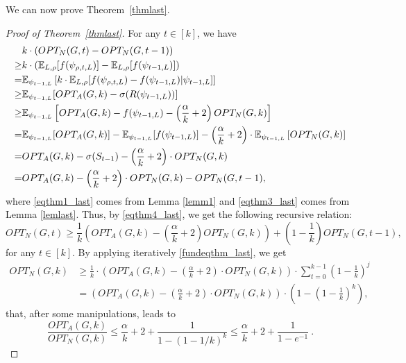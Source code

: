 We can now prove Theorem~\ref{thmlast}.
\begin{proof}[Proof of Theorem~\ref{thmlast}]
For any $t\in [k]$, we have
\begin{align}
&k\cdot (OPT_N(G,t)-OPT_N(G,t-1))\nonumber\\
\geq &k\cdot (\mathbb{E}_{L,\rho}[f({\psi}_{\rho,t,L})]-\mathbb{E}_{L,\rho}[f(\psi_{t-1,L})])\nonumber\\
=& \mathbb{E}_{\psi_{t-1,L}}\left[k\cdot \mathbb{E}_{L,\rho}[f({\psi}_{\rho,t,L})-f(\psi_{t-1,L})|\psi_{t-1,L}]\right]\nonumber\\
\geq &\mathbb{E}_{\psi_{t-1,L}}[OPT_A(G,k)-\sigma(R(\psi_{t-1,L}))]\label{eqthm1_last}\\
\geq &\mathbb{E}_{\psi_{t-1,L}}\left[OPT_A(G,k)-f(\psi_{t-1,L})-\left(\frac{\alpha}{k}+2\right)OPT_N(G,k)\right]\label{eqthm3_last}\\
=& \mathbb{E}_{\psi_{t-1,L}}[OPT_A(G,k)]-\mathbb{E}_{\psi_{t-1,L}}[f(\psi_{t-1,L})]-\left(\frac{\alpha}{k}+2\right)\cdot\mathbb{E}_{\psi_{t-1,L}}\left[OPT_N(G,k)\right]\nonumber\\
= &OPT_A(G,k)-\sigma(S_{t-1})-\left(\frac{\alpha}{k}+2\right)\cdot OPT_N(G,k)\nonumber\\
= &OPT_A(G,k)-\left(\frac{\alpha}{k}+2\right)\cdot OPT_N(G,k)-OPT_N(G,t-1)\label{eqthm4_last},
\end{align}
where \eqref{eqthm1_last} comes from Lemma \ref{lemm1} and \eqref{eqthm3_last} comes from Lemma \ref{lemlast}. Thus, by \eqref{eqthm4_last}, we get the following recursive relation:
\begin{equation}\label{fundeqthm_last}
OPT_N(G,t)\geq \frac{1}{k}\left(OPT_A(G,k)-\left(\frac{\alpha}{k}+2\right)OPT_N(G,k)\right)+\left(1-\frac{1}{k}\right)OPT_N(G,t-1),
\end{equation}
for any $t\in [k]$. By applying iteratively \eqref{fundeqthm_last}, we get 
\begin{align*}
OPT_N(G,k)
&\geq \frac{1}{k}\cdot \left(OPT_A(G,k)-\left(\frac{\alpha}{k}+2\right)\cdot OPT_N(G,k)\right)\cdot \sum_{t=0}^{k-1} \left(1-\frac{1}{k}\right)^j\\
&=\left(OPT_A(G,k)-\left(\frac{\alpha}{k}+2\right)\cdot OPT_N(G,k)\right)\cdot \left(1-\left(1-\frac{1}{k}\right)^k\right),
\end{align*}
that, after some manipulations, leads to 
\begin{equation}\label{semifinal_bound}
\frac{OPT_A(G,k)}{OPT_N(G,k)}\leq \frac{\alpha}{k}+2+ \frac{1}{1-(1-1/k)^k} \leq \frac{\alpha}{k}+2+ \frac{1}{1-e^{-1}}~.

\end{equation}
\end{proof}
